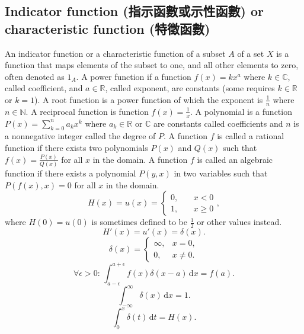 \documentclass[a4paper,12pt]{report}
\begin{document}
\subsection{Indicator function (指示函數或示性函數) or characteristic function (特徵函數)}
An indicator function or a characteristic function of a subset $A$ of a set $X$ is a function that maps elements of the subset to one, and all other elements to zero, often denoted as $1_A$.
A power function if a function $f(x)=kx^a$ where $k\in\mathbb{C}$, called coefficient, and $a\in\mathbb{R}$, called exponent, are constants (some requires $k\in\mathbb{R}$ or $k=1$).
A root function is a power function of which the exponent is $\frac{1}{n}$ where $n\in\mathbb{N}$.
A reciprocal function is function $f(x)=\frac{1}{x}$.
A polynomial is a function $P(x)=\sum_{k=0}^na_kx^k$ where $a_k\in\mathbb{R}$ or $\mathbb{C}$ are constants called coefficients and $n$ is a nonnegative integer called the degree of $P$.
A function $f$ is called a rational function if there exists two polynomials $P(x)$ and $Q(x)$ such that $f(x)=\frac{P(x)}{Q(x)}$ for all $x$ in the domain.
A function $f$ is called an algebraic function if there exists a polynomial $P(y,x)$ in two variables such that $P(f(x),x)=0$ for all $x$ in the domain.
\[H(x)=u(x)=
\begin{cases}0,\quad &x<0\\
1,\quad &x\geq 0
\end{cases},\]
where $H(0)=u(0)$ is sometimes defined to be $\frac{1}{2}$ or other values instead.
\[H'(x)=u'(x)=\delta(x).\]
\[
\delta(x) =
\begin{cases}
\infty, & x = 0, \\
0, & x \neq 0.
\end{cases}
\]
\[
\forall \epsilon > 0:\,\int_{a-\epsilon}^{a+\epsilon} f(x) \delta(x-a) \, \mathrm{d}x = f(a).
\]
\[
\int _{-\infty }^{\infty }\delta(x) \, \mathrm{d}x = 1.
\]
\[\int_0^x\delta(t)\,\mathrm{d}t=H(x).\]
\end{document}
